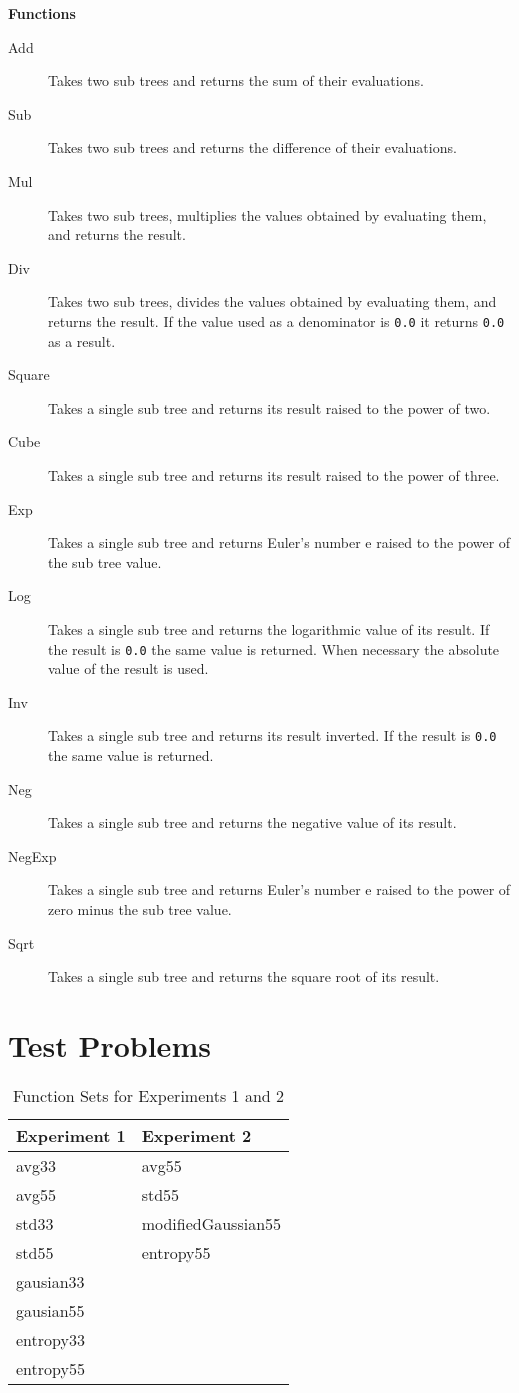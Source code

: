 \documentclass[titlepage,letterpaper]{article}
\begin{document}
\textbf{Functions}
\begin{description}
\item [Add] Takes two sub trees and returns the sum of their evaluations.
\item [Sub] Takes two sub trees and returns the difference of their evaluations.
\item [Mul] Takes two sub trees, multiplies the values obtained by evaluating them, and returns the result.
\item [Div] Takes two sub trees, divides the values obtained by evaluating them, and returns the result. If the value used as a denominator is \texttt{0.0} it returns \texttt{0.0} as a result.
\item [Square] Takes a single sub tree and returns its result raised to the power of two.
\item [Cube] Takes a single sub tree and returns its result raised to the power of three.
\item [Exp] Takes a single sub tree and returns Euler's number e raised to the power of the sub tree value.
\item [Log] Takes a single sub tree and returns the logarithmic value of its result. If the result is \texttt{0.0} the same value is returned. When necessary the absolute value of the result is used.
\item [Inv] Takes a single sub tree and returns its result inverted. If the result is \texttt{0.0} the same value is returned.
\item [Neg] Takes a single sub tree and returns the negative value of its result.
\item [NegExp] Takes a single sub tree and returns Euler's number e raised to the power of zero minus the sub tree value.
\item [Sqrt] Takes a single sub tree and returns the square root of its result.
\end{description}

\section{Test Problems}
\label{sec:Problems}


\begin{table}[H]
\centering
\begin{tabular}{p{4cm} | p{4cm} } 
Experiment 1 & Experiment 2 \\\hline
avg33 & avg55 \\
avg55 & std55 \\
std33 & modifiedGaussian55 \\
std55 & entropy55 \\
gausian33 & \\
gausian55 & \\
entropy33 & \\
entropy55 & 
\end{tabular}
\caption{Function Sets for Experiments 1 and 2} 
\label{tab:experimentAtable}
\end{table}
\end{document}
